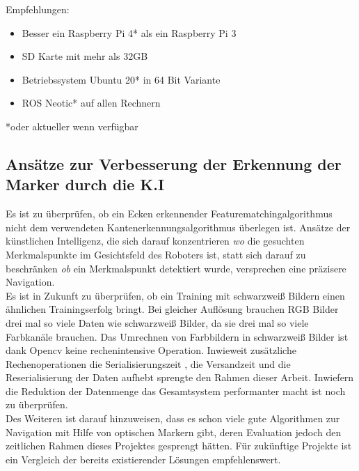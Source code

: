\documentclass[conference]{IEEEtran}
\begin{document}
Empfehlungen:
\begin{itemize}
	\item  Besser ein Raspberry Pi 4* als ein Raspberry Pi 3
	\item  SD Karte mit mehr als 32GB
	\item Betriebssystem Ubuntu 20* in 64 Bit Variante
	\item  ROS Neotic* auf allen Rechnern
\end{itemize}
*oder aktueller wenn verfügbar
\subsection{Ansätze zur Verbesserung der Erkennung der Marker durch die K.I}

Es ist zu überprüfen, ob ein Ecken erkennender Featurematchingalgorithmus nicht dem verwendeten Kantenerkennungsalgorithmus überlegen ist. Ansätze der künstlichen Intelligenz, die sich darauf konzentrieren \textit{wo} die gesuchten Merkmalspunkte  im Gesichtsfeld des Roboters ist, statt sich darauf zu beschränken \textit{ob} ein Merkmalspunkt detektiert wurde, versprechen eine präzisere Navigation. \\
Es ist in Zukunft zu überprüfen, ob ein Training mit schwarzweiß Bildern einen ähnlichen Trainingserfolg bringt. Bei gleicher Auflösung brauchen RGB Bilder drei mal so viele Daten wie schwarzweiß Bilder, da sie drei mal so viele Farbkanäle brauchen. Das Umrechnen von Farbbildern in schwarzweiß Bilder ist dank Opencv keine rechenintensive Operation. Inwieweit zusätzliche Rechenoperationen die Serialisierungszeit , die Versandzeit und die Reserialisierung der Daten aufhebt sprengte den Rahmen dieser Arbeit. Inwiefern die Reduktion der Datenmenge das Gesamtsystem performanter macht ist noch zu überprüfen.
\\
Des Weiteren ist darauf hinzuweisen, dass es schon viele gute Algorithmen zur Navigation mit Hilfe von optischen Markern gibt, deren Evaluation jedoch den zeitlichen Rahmen dieses Projektes gesprengt hätten. Für zukünftige Projekte ist ein Vergleich der bereits existierender Lösungen empfehlenswert.

\end{document}
